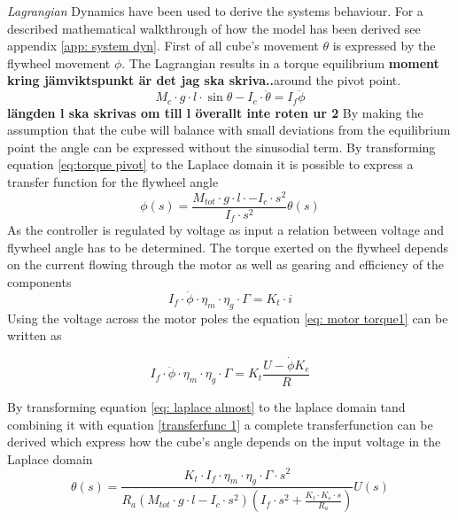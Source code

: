 \documentclass[a4paper,11pt]{kth-mag}
\begin{document}
\emph{Lagrangian} Dynamics have been used to derive the systems behaviour. For a described mathematical walkthrough of how the model has been derived see appendix \ref{app: system dyn}. First of all cube's movement $\theta$ is expressed by the flywheel movement $\phi$. The Lagrangian  results in a torque equilibrium \textbf{moment kring jämviktspunkt är det jag ska skriva..}around the pivot point. 
\begin{equation} \label{eq:torque pivot}
M_c \cdot g \cdot l \cdot \sin \theta - I_c \cdot \ddot{\theta} = I_f \ddot{\phi}
\end{equation}
\textbf{längden l ska skrivas om till l överallt inte roten ur 2}
By making the assumption that the cube will balance with small deviations from the equilibrium point the angle can be expressed without the sinusodial term. By transforming equation \ref{eq:torque pivot} to the Laplace domain it is possible to express a transfer function for the flywheel angle
\begin{equation} \label{transferfunc 1}
\phi (s) = \frac{M_{tot} \cdot g \cdot l \cdot-I_c \cdot s^2}{I_f \cdot s^2}  \theta(s)
\end{equation}
As the controller is regulated by voltage as input a relation between voltage and flywheel angle has to be determined. The torque exerted on the flywheel depends on the current flowing through the motor as well as gearing and efficiency of the components
\begin{equation} \label{eq: motor torque1}
I_f \cdot \ddot{\phi} \cdot \eta_m \cdot \eta_g \cdot \Gamma = K_t \cdot i
\end{equation}
Using the voltage across the motor poles the equation \ref{eq: motor torque1} can be written as

\begin{equation} \label{eq: laplace almost}
I_f \cdot \ddot{\phi} \cdot \eta_m \cdot \eta_g \cdot \Gamma = K_t \frac{U - \dot{\phi} K_e}{R}
\end{equation} 

By transforming equation \ref{eq: laplace almost} to the laplace domain tand combining it with equation \ref{transferfunc 1} a complete transferfunction can be derived which express how the cube's angle depends on the input voltage in the Laplace domain
\begin{equation}
\theta(s) = \frac{K_t \cdot I_f \cdot \eta_m \cdot \eta_g \cdot \Gamma \cdot s^2}{R_a (M_{tot} \cdot g \cdot l - I_c \cdot s^2)(I_f \cdot s^2 + \frac{K_t \cdot K_e \cdot s}{R_a})} U(s)
\end{equation}
\end{document}
